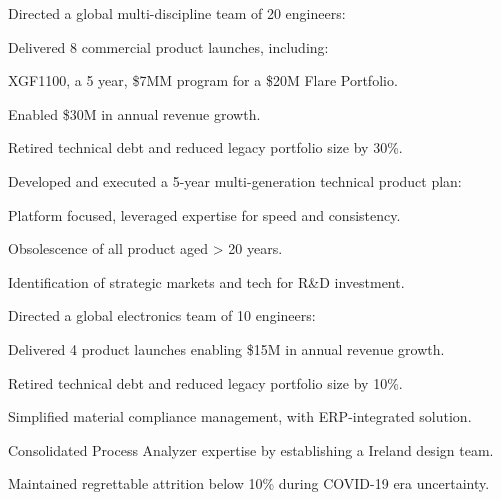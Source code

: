 \begin{tightemize}
	\item Directed a global multi-discipline team of 20 engineers:
	\vspace{.5\topsep} %
	\begin{tightemize}
		\item Delivered 8 commercial product launches, including:
		\vspace{.5\topsep} %
		\begin{tightemize}
			\item XGF1100, a 5 year, \$7MM program for a \$20M Flare Portfolio.
		\end{tightemize}
		\vspace{.5\topsep} %
		\item Enabled \$30M in annual revenue growth.
		\item Retired technical debt and reduced legacy portfolio size by 30\%.
	\end{tightemize}
	\vspace{.5\topsep} %
	\item Developed and executed a 5-year multi-generation technical product plan:
	\vspace{.5\topsep} %
	\begin{tightemize}
		\item Platform focused, leveraged expertise for speed and consistency.
		\item Obsolescence of all product aged > 20 years.
		\item Identification of strategic markets and tech for R&D investment.
	\end{tightemize}
	\vspace{.5\topsep} %
\end{tightemize}
\begin{tightemize}
	\item Directed a global electronics team of 10 engineers:
	\vspace{.5\topsep} %
	\begin{tightemize}
		\item Delivered 4 product launches enabling \$15M in annual revenue growth.
		\item Retired technical debt and reduced legacy portfolio size by 10\%.
	\end{tightemize}
	\vspace{.5\topsep} %
	\item Simplified material compliance management, with ERP-integrated solution.
	\item Consolidated Process Analyzer expertise by establishing a Ireland design team.
	\item Maintained regrettable attrition below 10\% during COVID-19 era uncertainty.
\end{tightemize}
